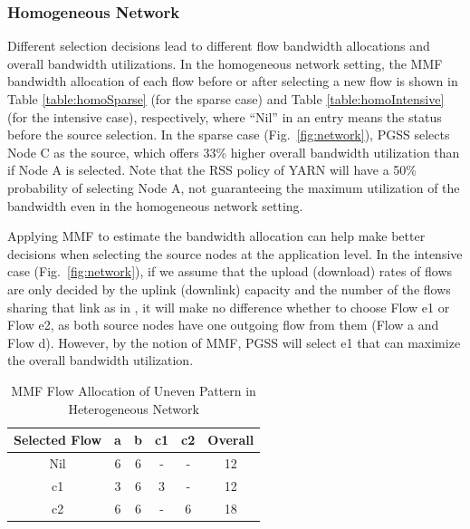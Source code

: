 \documentclass[10pt,journal,compsoc]{IEEEtran}
\begin{document}
\subsubsection{Homogeneous Network}
Different selection decisions lead to different flow bandwidth allocations and overall bandwidth utilizations. 
In the homogeneous network setting, the MMF bandwidth
allocation of each flow before or after selecting a new flow is
shown in Table \ref{table:homoSparse} (for the sparse case) and Table
\ref{table:homoIntensive} (for the intensive case), respectively, where ``Nil'' in an entry means the status before the source selection.
In the sparse case (Fig.~\ref{fig:network}), PGSS selects Node C as the source, which offers 33\% higher overall
bandwidth utilization than if Node A is selected.
Note that the RSS policy of YARN will have a 50\% probability of selecting
Node A, not guaranteeing the maximum utilization of the bandwidth
even in the homogeneous network setting.

Applying MMF to estimate the bandwidth allocation can
help make better decisions when selecting the source nodes at the
application level.
In the intensive case (Fig.~\ref{fig:network}), if we assume that the upload (download)
rates of flows are only decided by the uplink (downlink)
capacity and the number of the flows sharing that link
as in \cite{chowdhury2011managing},
it will make no difference whether to choose Flow e1 or Flow e2,
as both source nodes have one outgoing flow from them 
(Flow a and Flow d). 
However, by the notion of MMF, PGSS will select e1 that can maximize the overall bandwidth utilization. 



\begin{table}[!t]
\renewcommand{\arraystretch}{1}
\caption{MMF Flow Allocation of Uneven Pattern in Heterogeneous Network}
\label{table:heteUneven}
\centering
\begin{tabularx}{.35\textwidth}{c||c|c|c|c|c}
\hline
\textbf{Selected Flow} & \textbf{a} & \textbf{b} & \textbf{c1} & \textbf{c2} & \textbf{Overall}\\
\hline
Nil &6&6&-&-&12\\
\hline
c1 &3&6&3&-&12\\
\hline
c2 &6&6&-&6&18\\
\hline
\end{tabularx}
\end{table}
\end{document}
